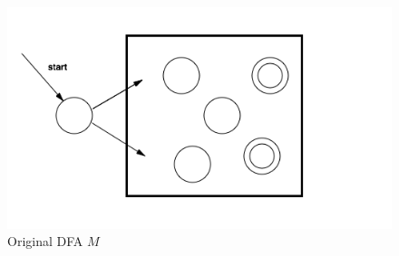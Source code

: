 %    
%
%
%
%
%    
%
%
%


\begin{figure}[H]
\centering
\includegraphics[scale=0.6]{original_dfa}
\caption{Original DFA $M$}
\end{figure}


